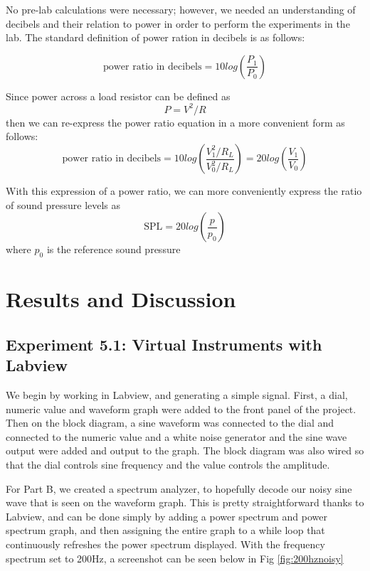 \documentclass[10pt]{article}
\begin{document}
No pre-lab calculations were necessary; however, we needed an understanding of decibels and their relation to power in order to perform the experiments in the lab. The standard definition of power ration in decibels is as follows:

$$ \text{power ratio in decibels} = 10log(\frac{P_1}{P_0})$$

Since power across a load resistor can be defined as $$P = V^2/R$$then we can re-express the power ratio equation in a more convenient form as follows: $$\text{power ratio in decibels} = 10log(\frac{V_1^2/R_L}{V_0^2/R_L}) = 20log(\frac{V_1}{V_0})$$

With this expression of a power ratio, we can more conveniently express the ratio of sound pressure levels as $$\text{SPL} = 20log(\frac{p}{p_0})$$ where $p_0$ is the reference sound pressure 

\medskip


\section{Results and Discussion}

\subsection{Experiment 5.1: Virtual Instruments with Labview }
\qquad We begin by working in Labview, and generating a simple signal. First, a dial, numeric value and waveform graph were added to the front panel of the project. Then on the block diagram, a sine waveform was connected to the dial and connected to the numeric value and a white noise generator and the sine wave output were added and output to the graph. The block diagram was also wired so that the dial controls sine frequency and the value controls the amplitude. 

For Part B, we created a spectrum analyzer, to hopefully decode our noisy sine wave that is seen on the waveform graph. This is pretty straightforward thanks to Labview, and can be done simply by adding a power spectrum and power spectrum graph, and then assigning the entire graph to a while loop that continuously refreshes the power spectrum displayed. With the frequency spectrum set to 200Hz, a screenshot can be seen below in Fig \ref{fig:200hznoisy}
\end{document}
